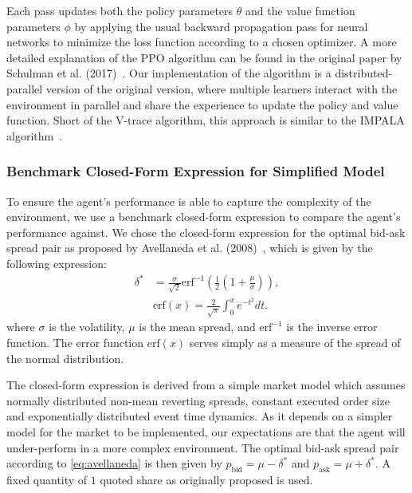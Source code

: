 Each pass updates both the policy parameters $\theta$ and the value function parameters $\phi$
by applying the usual backward propagation pass for neural networks to minimize the loss function according to a chosen optimizer.
A more detailed explanation of the PPO algorithm can be found in the original paper by Schulman et al. (2017)~\cite{Schulman2017}.
Our implementation of the algorithm is a distributed-parallel version of the original version,
where multiple learners interact with the environment in parallel and share the experience to update the policy and value function.
Short of the V-trace algorithm, this approach is similar to the IMPALA algorithm~\cite{Espeholt2018}.
\subsubsection{Benchmark Closed-Form Expression for Simplified Model}
To ensure the agent's performance is able to capture the complexity of the environment, we use a benchmark closed-form expression
to compare the agent's performance against.
We chose the closed-form expression for the optimal bid-ask spread pair as proposed by Avellaneda et al. (2008)~\cite{Avellaneda2008},
which is given by the following expression:
\begin{equation}
    \begin{aligned}
        \delta^* &= \frac{\sigma}{\sqrt{2}} \text{erf}^{-1} \left( \frac{1}{2} \left( 1 + \frac{\mu}{\sigma} \right) \right),\\
        &\text{erf}(x) = \frac{2}{\sqrt{\pi}} \int_{0}^{x} e^{-t^2} dt.
    \end{aligned}
    \label{eq:avellaneda}
\end{equation}
where $\sigma$ is the volatility, $\mu$ is the mean spread, and $\text{erf}^{-1}$ is the inverse error function.
The error function $\text{erf}(x)$ serves simply as a measure of the spread of the normal distribution.

The closed-form expression is derived from a simple market model which assumes normally distributed non-mean reverting spreads,
constant executed order size and exponentially distributed event time dynamics.
As it depends on a simpler model for the market to be implemented, our expectations are that the agent will under-perform in a more complex environment.
The optimal bid-ask spread pair according to \autoref{eq:avellaneda} is then given by $p_\text{bid} = \mu - \delta^*$ and $p_\text{ask} = \mu + \delta^*$.
A fixed quantity of $1$ quoted share as originally proposed is used.
